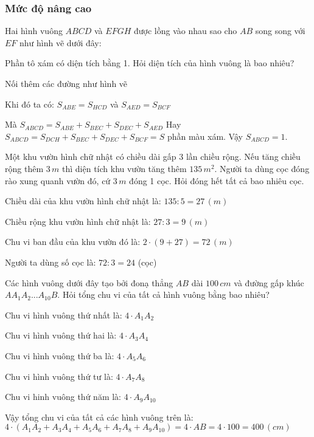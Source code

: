 \subsubsection*{Mức độ nâng cao}
\begin{bt}
	Hai hình vuông $ABCD$ và $EFGH$ được lồng vào nhau sao cho $AB$ song song với $EF$ như hình vẽ dưới đây:
	
	Phần tô xám có diện tích bằng 1. Hỏi diện tích của hình vuông là bao nhiêu?
	\begin{loigiaichuong37}
		Nối thêm các đường như hình vẽ 
		
		Khi đó ta có:  ${{S}_{ABE}}={{S}_{HCD}}$  và  ${{S}_{AED}}={{S}_{BCF}}$ 
		
		Mà  ${{S}_{ABCD}}={{S}_{ABE}}+{{S}_{BEC}}+{{S}_{DEC}}+{{S}_{AED}}$ 
		Hay  ${{S}_{ABCD}}={{S}_{DCH}}+{{S}_{BEC}}+{{S}_{DEC}}+{{S}_{BCF}}=S$ phần màu xám.
		Vậy  ${{S}_{ABCD}}=1$.
	\end{loigiaichuong37}
\end{bt} 
\begin{bt}
	Một khu vườn hình chữ nhật có chiều dài gấp 3 lần chiều rộng. Nếu tăng chiều rộng thêm  $3 \,m$ thì diện tích khu vườn tăng thêm  $135\, m^2$.  Người ta dùng cọc đóng rào xung quanh vườn đó, cứ  $3 \,m$ đóng 1 cọc. Hỏi đóng hết tất cả bao nhiêu cọc.
	\begin{loigiaichuong37}
		Chiều dài của khu vườn hình chữ nhật là:  $135:5=27\,(m)$
		 
		Chiều rộng khu vườn hình chữ nhật là:  $27:3=9 \,(m)$ 
		
		Chu vi ban đầu của khu vườn đó là:  $2\cdot(9+27)=72\,(m)$ 
		
		Người ta dùng số cọc là:  $72:3=24$ (cọc)
	\end{loigiaichuong37}
\end{bt}
\begin{bt}
	Các hình vuông dưới đây tạo bởi đonạ thẳng  $AB$ dài  $100 \,cm$  và đường gấp khúc $A{{A}_{1}}{{A}_{2}}...{{A}_{10}}B.$  Hỏi tổng chu vi của tất cả hình vuông bằng bao nhiêu?
	\begin{loigiaichuong37}
		Chu vi hình vuông thứ nhất là:  $4\cdot{{A}_{1}}{{A}_{2}}$ 
		
		Chu vi hình vuông thứ hai là:  $4\cdot{{A}_{3}}{{A}_{4}}$ 
		
		Chu vi hình vuông thứ ba là:  $4\cdot{{A}_{5}}{{A}_{6}}$ 
		
		Chu vi hình vuông thứ tư là:  $4\cdot{{A}_{7}}{{A}_{8}}$ 
		
		Chu vi hinh vuông thứ năm là:  $4\cdot{{A}_{9}}{{A}_{10}}$ 
		
		Vậy tổng chu vi của tất cả các hình vuông trên là: 
		$4\cdot({{A}_{1}}{{A}_{2}}+{{A}_{3}}{{A}_{4}}+{{A}_{5}}{{A}_{6}}+{{A}_{7}}{{A}_{8}}+{{A}_{9}}{{A}_{10}})=4\cdot AB=4\cdot 100=400 \,(cm)$ 
	\end{loigiaichuong37}
\end{bt}
